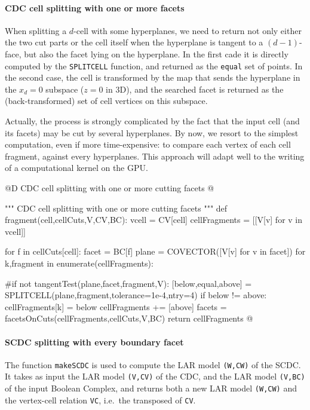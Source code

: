 \documentclass[11pt,oneside]{article}	%
\begin{document}
\paragraph{CDC cell splitting with one or more facets}

When splitting a $d$-cell with some hyperplanes, we need to return not only either the two cut parts or the cell itself when the hyperplane is tangent to a $(d-1)$-face, but also the facet lying on the hyperplane. 
In the first cade it is directly computed by the \texttt{SPLITCELL} function, and returned as the \texttt{equal} set of points. In the second case, the cell is transformed by the map that sends the hyperplane in the $x_d=0$ subspace ($z=0$ in 3D), and the searched facet is returned as the (back-transformed) set of cell vertices on this subspace. 

Actually, the process is strongly complicated by the fact that the input cell (and its facets) may be cut by several hyperplanes. By now, we resort to the simplest computation, even if more time-expensive:  to compare each vertex of each cell fragment, against every hyperplanes. This approach will adapt well to the writing of a computational kernel on the GPU.

@D CDC cell splitting with one or more cutting facets
@{""" CDC cell splitting with one or more cutting facets """
def fragment(cell,cellCuts,V,CV,BC):
	vcell = CV[cell]
	cellFragments = [[V[v] for v in vcell]]
	
	for f in cellCuts[cell]:
		facet = BC[f]
		plane = COVECTOR([V[v] for v in facet])
		for k,fragment in enumerate(cellFragments):
		
			#if not tangentTest(plane,facet,fragment,V):
			[below,equal,above] = SPLITCELL(plane,fragment,tolerance=1e-4,ntry=4)
			if below != above:
				cellFragments[k] = below
				cellFragments += [above]
		facets = facetsOnCuts(cellFragments,cellCuts,V,BC)
	return cellFragments
@}

\paragraph{SCDC splitting with every boundary facet}
The function \texttt{makeSCDC} is used  to compute the LAR model \texttt{(W,CW)} of the SCDC.
It takes as input the LAR model \texttt{(V,CV)} of the CDC, and the LAR model \texttt{(V,BC)} of the input Boolean Complex, and returns both a new LAR model \texttt{(W,CW)} and the vertex-cell relation \texttt{VC}, i.e.~the transposed of \texttt{CV}.
\end{document}
